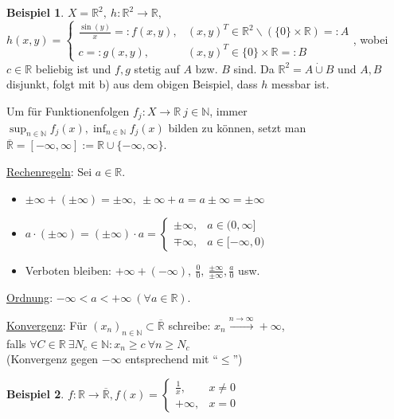 \documentclass[a4paper]{report}
\newcommand{\R}{\mathbb{R}}
\newcommand{\Rq}{\overline{\R}}
\newcommand{\N}{\mathbb{N}}
\newcommand{\dcup}{\dot{\cup}}
\newcommand{\jabb}[3]{ #1: #2 \rightarrow #3 }
\newcommand{\jspacesmall}{\vspace{4pt}}
\theoremstyle{plain}
\theoremstyle{definition}
\newtheorem*{expl*}{Beispiel}
\begin{document}
{{{\begin{expl*}
    $X = \R^2, \ \jabb{h}{\R^2}{\R},$\\
    $h(x,y) = \begin{cases} \frac{\sin(y)}{x}=:f(x,y), & (x,y)^T \in \R^2\backslash (\{0\}\times \R) =: A \\ c=:g(x,y), & (x,y)^T \in \{0\} \times \R =: B \end{cases}$,
    wobei $c\in \R$ beliebig ist und $f,g$ stetig auf $A$ bzw. $B$ sind. Da $\R^2 = A\dcup B$ und $A,B$ disjunkt, folgt mit b) aus dem obigen Beispiel, dass $h$ messbar ist.
\end{expl*}
Um für Funktionenfolgen $\jabb{f_j}{X}{\R}\ j\in\N$, immer $\sup_{n\in\N} f_j(x), \inf_{n\in\N} f_j(x)$ bilden zu können, setzt man $\Rq = [-\infty, \infty] := \R \cup \{-\infty, \infty\}$.

\vspace{12pt}

\uline{Rechenregeln}: Sei $a\in \R$.
\begin{itemize}
    \item $\pm \infty + (\pm \infty) = \pm \infty, \ \pm\infty + a = a \pm \infty = \pm \infty$
    \item $a\cdot (\pm\infty) = (\pm \infty)\cdot a = \begin{cases} \pm \infty, & a\in (0, \infty] \\ \mp \infty, &a\in [-\infty, 0) \end{cases}$
    \item Verboten bleiben: $+\infty + (-\infty),\ \frac{0}{0}, \ \frac{\pm\infty}{\pm\infty}, \frac{a}{0}$ usw.
\end{itemize}

\jspacesmall

\uline{Ordnung}: $-\infty < a < +\infty \ (\forall a\in \R)$.

\jspacesmall

\uline{Konvergenz}: Für $(x_n)_{n\in\N}\subset \Rq$ schreibe: $x_n \xrightarrow{n\rightarrow \infty} +\infty$,\\
falls $\forall C\in\R \ \exists N_c \in \N: x_n \ge c \ \forall n\ge N_c$\\
(Konvergenz gegen $-\infty$ entsprechend mit ``$\le$'')

\begin{expl*}
    $\jabb{f}{\R}{\Rq}, f(x) = \begin{cases} \frac{1}{x}, & x\ne 0 \\ +\infty, &x = 0 \end{cases}$
\end{expl*}

}}}
\end{document}
